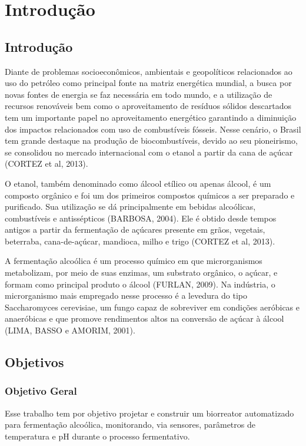 \chapter[Introdução]{Introdução}

\section{Introdução}

Diante de problemas socioeconômicos, ambientais e geopolíticos relacionados ao uso do petróleo como principal fonte na matriz energética mundial, a busca por novas fontes de energia se faz necessária em todo mundo, e a utilização de recursos renováveis bem como o aproveitamento de resíduos sólidos descartados tem um importante papel no aproveitamento energético garantindo a diminuição dos impactos relacionados com uso de combustíveis fósseis. Nesse cenário, o Brasil tem grande destaque na produção de biocombustíveis, devido ao seu pioneirismo, se consolidou no mercado internacional com o etanol a partir da cana de açúcar (CORTEZ et al, 2013).

O etanol, também denominado como álcool etílico ou apenas álcool, é um composto orgânico e foi um dos primeiros compostos químicos a ser preparado e purificado. Sua utilização se dá principalmente em bebidas alcoólicas, combustíveis e antissépticos (BARBOSA, 2004). Ele é obtido desde tempos antigos a partir da fermentação de açúcares presente em grãos, vegetais, beterraba, cana-de-açúcar, mandioca, milho e trigo (CORTEZ et al, 2013).

A fermentação alcoólica é um processo químico em que microrganismos metabolizam, por meio de suas enzimas, um substrato orgânico, o açúcar, e formam como principal produto o álcool (FURLAN, 2009). Na indústria, o microrganismo mais empregado nesse processo é a levedura do tipo Saccharomyces cerevisiae, um fungo capaz de sobreviver em condições aeróbicas e anaeróbicas e que promove rendimentos altos na conversão de açúcar à álcool (LIMA, BASSO e AMORIM, 2001).

\section{Objetivos}

\subsection{Objetivo Geral}

Esse trabalho tem por objetivo projetar e construir um biorreator automatizado para fermentação alcoólica, monitorando, via sensores, parâmetros de temperatura e pH durante o processo fermentativo.

